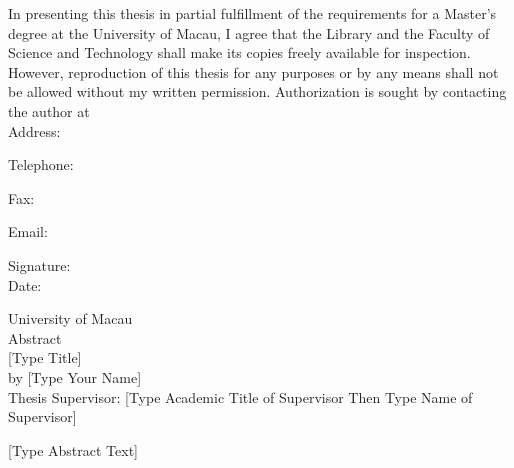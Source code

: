 \begin{titlepage}
\newpage
\thispagestyle{umempty}
\vspace*{4\baselineskip}
{ In presenting this thesis in partial fulfillment of the requirements for a Master's degree at the University of Macau, I agree that the Library and the Faculty of Science and Technology shall make its copies freely available for inspection. However, reproduction of this thesis for any purposes or by any means shall not be allowed without my written permission.
Authorization is sought by contacting the author at}\\[2\baselineskip]
\mbox{\qquad} Address:\par
\mbox{\qquad} Telephone:\par
\mbox{\qquad} Fax:\par
\mbox{\qquad} Email: \par
\mbox{\hspace{24em}}Signature:\underline{\hspace*{2.6cm}} \\[\baselineskip]
\mbox{\hspace{24em}} Date:\underline{\hspace*{3.3cm}}


\newpage
\thispagestyle{umempty}
\begin{center}
\vspace*{5\baselineskip}
\textit{}
\end{center}

\newpage
\thispagestyle{umempty}
\vspace*{1\baselineskip}
\begin{center}
{\large University of Macau \\ [1\baselineskip]
Abstract} \\ [2\baselineskip]
[Type Title] \\ [1\baselineskip]
by [Type Your Name] \\ [1\baselineskip]
Thesis Supervisor: [Type Academic Title of Supervisor Then Type Name of Supervisor]
\end{center}
[Type Abstract Text]

\afterpage{\thispagestyle{umempty}\null\newpage}
\end{titlepage}
